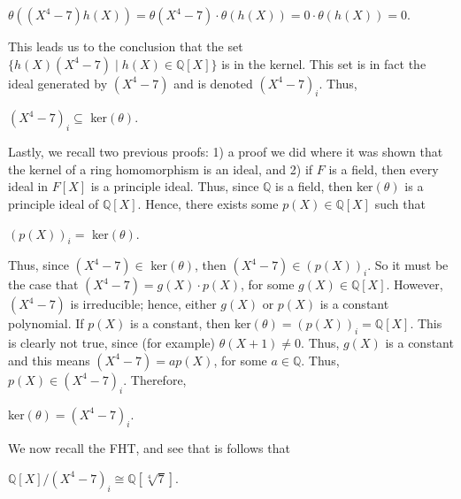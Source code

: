 \documentclass[12pt, a4paper]{article}
\begin{document}
\vspace{4mm}

\centerline{$\theta((X^4-7)h(X))=\theta(X^4-7)\cdot\theta(h(X))=0\cdot\theta(h(X))=0$.}

\vspace{4mm}

\noindent This leads us to the conclusion that the set $\{h(X)(X^4-7)\mid h(X)\in\mathbb{Q}[X]\}$ is in the kernel. This set is in fact the ideal generated by $(X^4-7)$ and is denoted $(X^4-7)_i$. Thus, 

\vspace{4mm}

\centerline{$(X^4-7)_i\subseteq$ ker$(\theta)$.}

\vspace{4mm}

\noindent Lastly, we recall two previous proofs: 1) a proof we did where it was shown that the kernel of a ring homomorphism is an ideal, and 2) if $F$ is a field, then every ideal in $F[X]$ is a principle ideal. Thus, since $\mathbb{Q}$ is a field, then ker$(\theta)$ is a principle ideal of $\mathbb{Q}[X]$. Hence, there exists some $p(X)\in\mathbb{Q}[X]$ such that 

\vspace{4mm}

\centerline{$(p(X))_i=$ ker$(\theta)$.}

\vspace{4mm}

Thus, since $(X^4-7)\in$ ker$(\theta)$, then $(X^4-7)\in(p(X))_i$. So it must be the case that $(X^4-7)=g(X)\cdot p(X)$, for some $g(X)\in\mathbb{Q}[X]$. However, $(X^4-7)$ is irreducible; hence, either $g(X)$ or $p(X)$ is a constant polynomial. If $p(X)$ is a constant, then ker$(\theta)=(p(X))_i=\mathbb{Q}[X]$. This is clearly not true, since (for example) $\theta(X+1)\neq 0$. Thus, $g(X)$ is a constant and this means $(X^4-7)=ap(X)$, for some $a\in\mathbb{Q}$. Thus, $p(X)\in(X^4-7)_i$. Therefore,

\vspace{4mm}

\centerline{ker$(\theta)=(X^4-7)_i$.}

\vspace{4mm}

\noindent We now recall the FHT, and see that is follows that

\vspace{4mm}

\centerline{$\mathbb{Q}[X]/(X^4-7)_i\cong\mathbb{Q}[\sqrt[4]{7}]$.}
\end{document}
